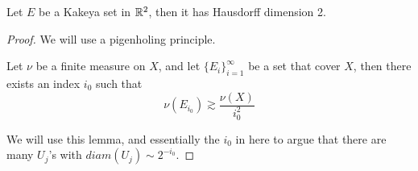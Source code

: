 \begin{theorem}
    Let $E$ be a Kakeya set in $\mathbb{R}^2$, then it has Hausdorff dimension 2.
\end{theorem}
\begin{proof}
    We will use a pigenholing principle. 
    \begin{lemma}
        Let $\nu$ be a finite measure on $X$, and let $\{E_i\}_{i=1}^\infty$ be a set that cover $X$, then there exists an index $i_0$ such that 
        \begin{equation*}
            \nu(E_{i_0})\gtrsim\frac{\nu(X)}{i_0^2}
        \end{equation*}
    \end{lemma}
    We will use this lemma, and essentially the $i_0$ in here to argue that there are many $U_j$'s with $diam(U_j)\sim 2^{-i_0}$.


\end{proof}
